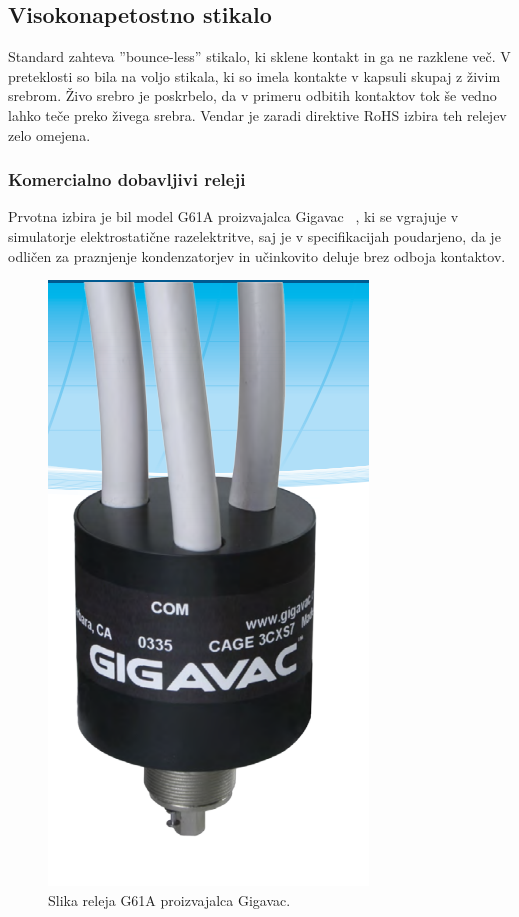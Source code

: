 \documentclass[a4paper,twoside,openright,12pt,Slovene]{book}
\begin{document}
	\subsection{Visokonapetostno stikalo} \label{Visokonapetostno stikalo}
	Standard zahteva ''bounce-less'' stikalo, ki sklene kontakt in ga ne razklene več. V preteklosti so bila na voljo stikala, ki so imela kontakte v kapsuli skupaj z živim srebrom. Živo srebro je poskrbelo, da v primeru odbitih kontaktov tok še vedno lahko teče preko živega srebra. Vendar je zaradi direktive RoHS izbira teh relejev zelo omejena.
	
	\subsubsection{Komercialno dobavljivi releji} \label{Komercialno dobavljivi releji}
     Prvotna izbira je bil model G61A proizvajalca Gigavac ~\cite{Gigavac:G61A}, ki se vgrajuje v simulatorje elektrostatične razelektritve, saj je v specifikacijah poudarjeno, da je odličen za praznjenje kondenzatorjev in učinkovito deluje brez odboja kontaktov.
    
    \begin{figure}[H]
        \centering
        \includegraphics[width=0.5\columnwidth]{Slike/GigavacG61C.png}
        \caption{\label{GigavacG61C} Slika releja G61A proizvajalca Gigavac.}
    \end{figure}    
    
\end{document}
